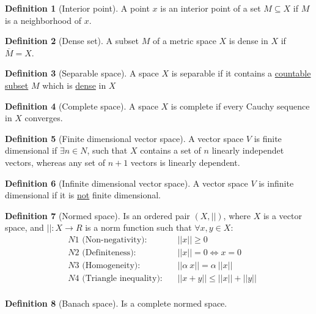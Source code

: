 \documentclass{article}
\theoremstyle{definition}
\newtheorem{definition}{Definition}
\begin{document}
\begin{definition}[Interior point]
  A point $x$ is an interior point of a set $M \subseteq X$ if $M$ is a neighborhood of $x$.
\end{definition}

\begin{definition}[Dense set]
  A subset $M$ of a metric space $X$ is dense in $X$ if $\overline{M} = X$.
\end{definition}

\begin{definition}[Separable space]
  A space $X$ is separable if it contains a \underline{countable subset} $M$ which is \underline{dense} in $X$
\end{definition}

\begin{definition}[Complete space]
  A space $X$ is complete if every Cauchy sequence in $X$ converges.
\end{definition}

\begin{definition}[Finite dimensional vector space]
  A vector space $V$ is finite dimensional if $\exists n \in N$, such that $X$ contains a set of $n$ linearly independet vectors, whereas any set of $n+1$ vectors is linearly dependent.
\end{definition}

\begin{definition}[Infinite dimensional vector space]
  A vector space $V$ is infinite dimensional if it is \underline{not} finite dimensional.
\end{definition}

\begin{definition}[Normed space]
  Is an ordered pair $(X, ||)$, where $X$ is a vector space, and $||: X \longrightarrow R$ is a norm function such that $\forall x,y \in X$:
  \begin{align*}
    &N1 \text{ (Non-negativity)}: &&||x|| \geq 0 \\
    &N2 \text{ (Definiteness)}: &&||x|| = 0 \iff x = 0 \\
    &N3 \text{ (Homogeneity)}: &&||\alpha \: x|| = \alpha \: ||x|| \\
    &N4 \text{ (Triangle inequality)}: &&||x + y|| \leq ||x|| + ||y|| \\
  \end{align*}
\end{definition}

\begin{definition}[Banach space]
  Is a complete normed space.
\end{definition}
\end{document}
